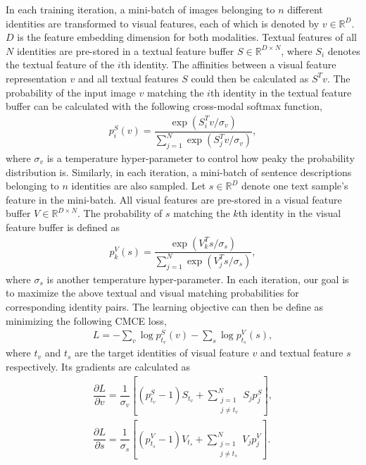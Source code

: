In each training iteration, a mini-batch of images belonging to $n$ different identities are transformed to visual features, each of which is denoted by $v \in \mathbb{R}^{D}$. $D$ is the feature embedding dimension for both modalities. Textual features of all $N$ identities are pre-stored in a textual feature buffer $S\in \mathbb{R}^{D\times N}$, where $S_i$ denotes the textual feature of the $i$th identity. The affinities between a visual feature representation $v$ and all textual features $S$ could then be calculated as $S^T v$.
The probability of the input image $v$ matching the $i$th identity in the textual feature buffer can be calculated with the following cross-modal softmax function,
\begin{align}
p_{i}^{S}(v)=\dfrac{\exp{(S_i^T v/\sigma_v)}}{\sum_{j=1}^{N}{\exp{(S_j^T v/\sigma_v)}}},
\label{eq:1}
\end{align}
where $\sigma_{v}$ is a temperature hyper-parameter to control how peaky the probability distribution is.
Similarly, in each iteration, a mini-batch of sentence descriptions belonging to $n$ identities are also sampled. Let $s \in \mathbb{R}^D$ denote one text sample's feature in the mini-batch. All visual features are pre-stored in a visual feature buffer $V\in \mathbb{R}^{D\times N}$. The probability of $s$ matching the $k$th identity in the visual feature buffer is defined as
\begin{align}
p_{k}^{V}(s)=\dfrac{\exp{(V_k^T s/\sigma_s)}}{\sum_{j=1}^{N}{\exp{(V_j^T s/\sigma_s)}}},
\label{eq:2}
\end{align}
where $\sigma_{s}$ is another temperature hyper-parameter.
In each iteration, our goal is to maximize the above textual and visual matching probabilities for corresponding identity pairs. The learning objective can then be define as minimizing the following CMCE loss,
\begin{align}
L=-\sum_{v}{\log{p_{t_v}^{S}} (v)}-\sum_{s}{\log{p_{t_s}^{V}} (s)},
\end{align}
where $t_v$ and $t_s$ are the target identities of visual feature $v$ and textual feature $s$ respectively. Its gradients are calculated as
\begin{align}
\dfrac{\partial{L}}{\partial{v}} = \dfrac{1}{\sigma_v} \left[ (p_{t_v}^{S}-1) S_{t_v}+ \sum_{\substack{j=1\\j\neq{t_v}}}^{N}{S_j p_{j}^{S}} \right],\\
\dfrac{\partial{L}}{\partial{s}}=\dfrac{1}{\sigma_s} \left[ (p_{t_s}^{V}-1) V_{t_s} + \sum_{\substack{j=1\\j\neq{t_s}}}^{N}{V_j p_{j}^{V}} \right].
\end{align}

